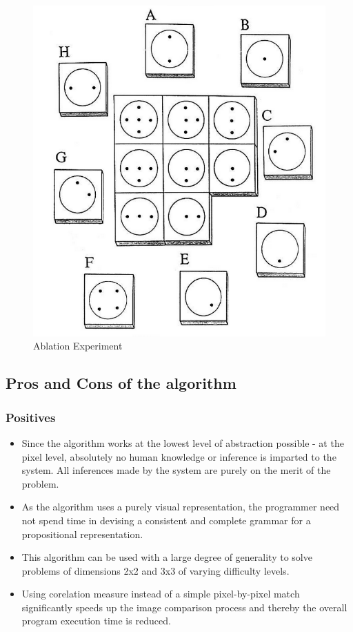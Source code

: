 \documentclass[10pt, letter]{article}
\begin{document}
\begin{figure}[h!]
  \centering
    \includegraphics[scale = 0.25]{Images/Exp2}
    \caption{Ablation Experiment}
  \label{exp2}
\end{figure}

\subsection*{Pros and Cons of the algorithm}
	\subsubsection*{Positives}
	\begin{itemize}
		\item Since the algorithm works at the lowest level of abstraction possible - at the pixel level, absolutely no human knowledge or inference is imparted to the system. All inferences made by the system are purely on the merit of the problem.
		\item As the algorithm uses a purely visual representation, the programmer need not spend time in devising a consistent and complete grammar for a propositional representation.
		\item This algorithm can be used with a large degree of generality to solve problems of dimensions 2x2 and 3x3 of varying difficulty levels.
		\item Using corelation measure instead of a simple pixel-by-pixel match significantly speeds up the image comparison process and thereby the overall program execution time is reduced.
	\end{itemize}
\end{document}
